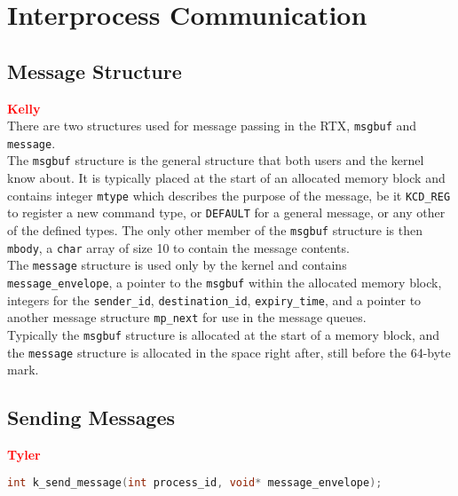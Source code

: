 \documentclass[12pt]{report}
\begin{document}

\section{Interprocess Communication}

\subsection{Message Structure}

\textcolor{red}{\textbf{Kelly}} \\
There are two structures used for message passing in the RTX, \texttt{msgbuf} and
\texttt{message}. \\
The \texttt{msgbuf} structure is the general structure that both users and the
kernel know about. It is typically placed at the start of an allocated memory block
and contains integer \texttt{mtype} which describes the purpose of the message, be it
\texttt{KCD_REG} to register a new command type, or \texttt{DEFAULT} for a general
message, or any other of the defined types. The only other member of the \texttt{msgbuf}
structure is then \texttt{mbody}, a \texttt{char} array of size 10 to contain the 
message contents. \\
The \texttt{message} structure is used only by the kernel and contains \texttt{message_envelope},
a pointer to the \texttt{msgbuf} within the allocated memory block, integers for the
\texttt{sender_id}, \texttt{destination_id}, \texttt{expiry_time}, and a pointer 
to another message structure \texttt{mp_next} for use in the message queues. \\
Typically the \texttt{msgbuf} structure is allocated at the start of a memory block,
and the \texttt{message} structure is allocated in the space right after, still before
the 64-byte mark.


\subsection{Sending Messages}

\textcolor{red}{\textbf{Tyler}} \\
\begin{minipage}{\textwidth}
\begin{lstlisting}[language=C, frame=single]
int k_send_message(int process_id, void* message_envelope);
\end{lstlisting}
\end{minipage}
\end{document}
